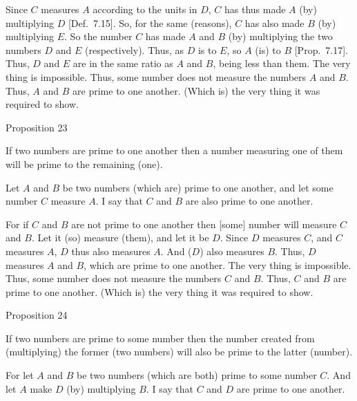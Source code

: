 Since $C$ measures $A$ according to the units in $D$,  $C$ has thus made $A$ (by)
multiplying $D$ [Def.~7.15].
So, for the same (reasons), $C$ has also made $B$ (by) multiplying
$E$. So the number $C$ has made $A$ and $B$ (by) multiplying the two
numbers $D$ and $E$ (respectively).  Thus, as $D$ is to $E$, so $A$ (is) to $B$ [Prop.~7.17]. Thus, $D$ and $E$ are in the same
ratio as $A$ and $B$, being less than them. The very thing is impossible. Thus,
some number does not measure the numbers $A$ and $B$. Thus, $A$ and $B$ are prime to one another. (Which is) the very thing it was required to show.


\begin{center}
{\large Proposition 23}
\end{center}

If two numbers are prime to one another then
a number measuring one of them will be prime to the remaining (one).

\epsfysize=2in
\centerline{}

Let $A$ and $B$ be two numbers (which are) prime to one another, and let some
number $C$ measure $A$. I say that $C$ and $B$ are also prime to one another.

For if $C$ and $B$ are not prime to one another then [some] number will measure
$C$ and $B$. Let it (so) measure (them), and let it be $D$. Since $D$ measures $C$,
and $C$ measures $A$, $D$ thus also measures $A$. And  ($D$) also measures $B$. 
Thus, $D$ measures $A$ and $B$, which are prime to one another. The very thing is
impossible. Thus, some number does not measure the numbers $C$ and $B$.
Thus, $C$ and $B$ are prime to one another. (Which is) the very thing it was required to show.


\begin{center}
{\large Proposition 24}
\end{center}

If two numbers are prime to some number then
the number created from (multiplying) the former (two numbers) will also be prime to
the latter (number).

\epsfysize=2in
\centerline{}

For let $A$ and $B$ be two numbers (which are both) prime to some number $C$. And let $A$ make
$D$ (by) multiplying $B$. I say that $C$ and $D$ are prime to one another.

